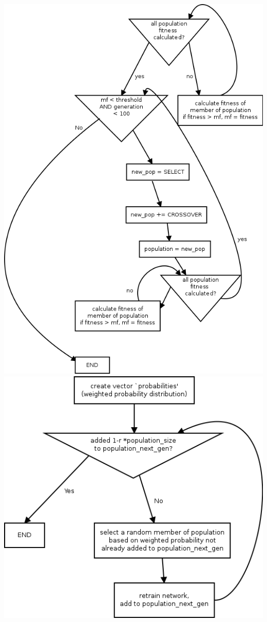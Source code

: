 \documentclass[11pt]{article}
\begin{document}
\includegraphics[width=\linewidth]{genetic_algorithm_diagram.png}
\includegraphics[width=\linewidth]{select.png}
\end{document}
